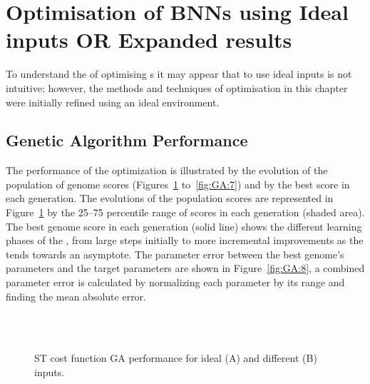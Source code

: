 \section{Optimisation of {BNN}s using Ideal inputs \textbf{OR} Expanded results}\label{sec:GA:ResultsIdeal}

To understand the of optimising {\BNN}s it may appear that to use ideal
inputs is not intuitive; however, the methods and techniques of {\GA}
optimisation in this chapter were initially refined using an ideal
environment.



\subsection{Genetic Algorithm Performance}



The performance of the {\GA} optimization is illustrated by the evolution
of the population of genome scores (Figures~\ref{fig:GA:5}
to~\ref{fig:GA:7}) and by the best score in each generation. The
evolutions of the population scores are represented in
Figure~\ref{fig:GA:5} by the 25--75 percentile range of scores in each
generation (shaded area). The best genome score in each generation
(solid line) shows the different learning phases of the {\GA}, from large
steps initially to more incremental improvements as the {\GA} tends
towards an asymptote. The parameter error between the best genome's
parameters and the target parameters are shown in Figure~\ref{fig:GA:8},
a combined parameter error is calculated by normalizing each parameter
by its range and finding the mean absolute error.

\smallskip{}

\begin{figure}[htb]
\centering
{}\hspace{2.2in} \hfill \\
\hfill\\
 \caption{ST cost function {GA} performance for ideal (A) and different (B) inputs.}\label{fig:GA:5}
\end{figure}


